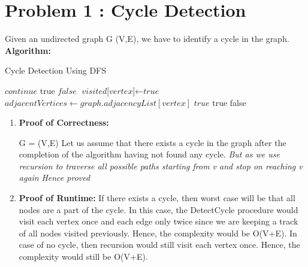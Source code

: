 \documentclass[12pt,letterpaper]{article}
\begin{document}
\section*{Problem 1 : Cycle Detection}
Given an undirected graph G (V,E), we have to identify a cycle in the graph.  \hfill \break
\textbf{Algorithm:}
\begin{algorithm}
    \caption{Cycle Detection Using DFS}\label{euclid}
    \begin{algorithmic}[1]
    \State $\textit{continue}$
    \EndIf
    \Return true
    \EndIf
    \EndFor
    \Return $\textit{false}$
    \EndProcedure
    \State $\textit{visited[vertex]}\gets \textit{true}$
    \State $adjacentVertices \gets graph.adjacencyList[vertex]$
    \Return $\textit{true}$
    \EndIf
    \Return true
    \EndIf
    \EndFor
    \Return false
    \EndProcedure
    \end{algorithmic}
\end{algorithm}

\begin{enumerate}


\item 
\textbf{Proof of Correctness:}
  
  G = (V,E) \newline
Let us assume that there exists a cycle in the graph after the completion of the algorithm having not found any cycle.\newline
{}\newline
\textit {But as we use recursion to traverse all possible paths starting from v and stop on reaching v again}\newline 
{}\newline 
{}\newline
\textit{Hence proved}
  
  
\newpage
\item
\textbf{Proof of Runtime:}
If there exists a cycle, then worst case will be that all nodes are a part of the cycle. In this case, the DetectCycle procedure would visit each vertex once and each edge only twice since we are keeping a track of all nodes visited previously. Hence, the complexity would be O(V+E). \newline
In case of no cycle, then recursion would still visit each vertex once. Hence, the complexity would still be O(V+E).
\newline
\end{enumerate}
\end{document}
